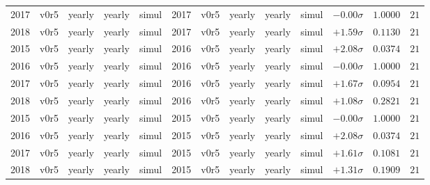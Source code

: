 \documentclass[aspectratio=43]{beamer}
\begin{document}
\begin{frame}
{\begin{tabular}{ccccc|ccccc|ccc}
          2017 &       v0r5 &     yearly &     yearly &      simul &       2017 &       v0r5 &     yearly &     yearly &      simul & $-0.00\sigma$ & $1.0000$ & $21$\\
          2018 &       v0r5 &     yearly &     yearly &      simul &       2017 &       v0r5 &     yearly &     yearly &      simul & $+1.59\sigma$ & $0.1130$ & $21$\\
          2015 &       v0r5 &     yearly &     yearly &      simul &       2016 &       v0r5 &     yearly &     yearly &      simul & $+2.08\sigma$ & $0.0374$ & $21$\\
          2016 &       v0r5 &     yearly &     yearly &      simul &       2016 &       v0r5 &     yearly &     yearly &      simul & $-0.00\sigma$ & $1.0000$ & $21$\\
          2017 &       v0r5 &     yearly &     yearly &      simul &       2016 &       v0r5 &     yearly &     yearly &      simul & $+1.67\sigma$ & $0.0954$ & $21$\\
          2018 &       v0r5 &     yearly &     yearly &      simul &       2016 &       v0r5 &     yearly &     yearly &      simul & $+1.08\sigma$ & $0.2821$ & $21$\\
          2015 &       v0r5 &     yearly &     yearly &      simul &       2015 &       v0r5 &     yearly &     yearly &      simul & $-0.00\sigma$ & $1.0000$ & $21$\\
          2016 &       v0r5 &     yearly &     yearly &      simul &       2015 &       v0r5 &     yearly &     yearly &      simul & $+2.08\sigma$ & $0.0374$ & $21$\\
          2017 &       v0r5 &     yearly &     yearly &      simul &       2015 &       v0r5 &     yearly &     yearly &      simul & $+1.61\sigma$ & $0.1081$ & $21$\\
          2018 &       v0r5 &     yearly &     yearly &      simul &       2015 &       v0r5 &     yearly &     yearly &      simul & $+1.31\sigma$ & $0.1909$ & $21$\\
    \end{tabular}
  }
  
  
  \end{frame} %
  
\end{document}
